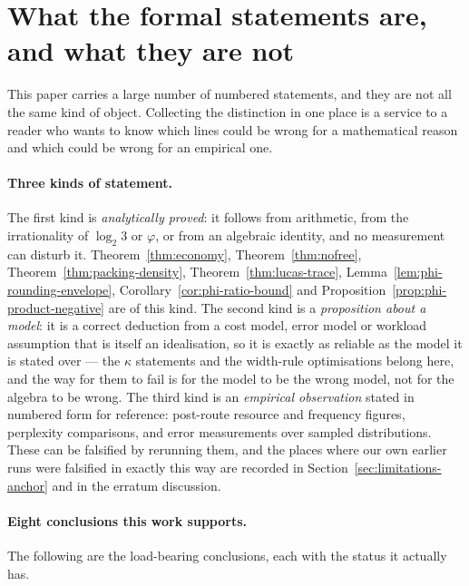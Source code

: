 \section{What the formal statements are, and what they are
not}\label{sec:statusofstatements}

This paper carries a large number of numbered statements, and they are not all the
same kind of object. Collecting the distinction in one place is a service to a
reader who wants to know which lines could be wrong for a mathematical reason and
which could be wrong for an empirical one.

\paragraph{Three kinds of statement.} The first kind is \emph{analytically
proved}: it follows from arithmetic, from the irrationality of $\log_2 3$ or
$\varphi$, or from an algebraic identity, and no measurement can disturb it.
Theorem~\ref{thm:economy}, Theorem~\ref{thm:nofree},
Theorem~\ref{thm:packing-density}, Theorem~\ref{thm:lucas-trace},
Lemma~\ref{lem:phi-rounding-envelope}, Corollary~\ref{cor:phi-ratio-bound} and
Proposition~\ref{prop:phi-product-negative} are of this kind. The second kind is a
\emph{proposition about a model}: it is a correct deduction from a cost model,
error model or workload assumption that is itself an idealisation, so it is exactly
as reliable as the model it is stated over --- the $\kappa$ statements and the
width-rule optimisations belong here, and the way for them to fail is for the
model to be the wrong model, not for the algebra to be wrong. The third kind is an
\emph{empirical observation} stated in numbered form for reference: post-route
resource and frequency figures, perplexity comparisons, and error measurements
over sampled distributions. These can be falsified by rerunning them, and the
places where our own earlier runs were falsified in exactly this way are recorded
in Section~\ref{sec:limitations-anchor} and in the erratum discussion.

\paragraph{Eight conclusions this work supports.} The following are the load-bearing
conclusions, each with the status it actually has.

